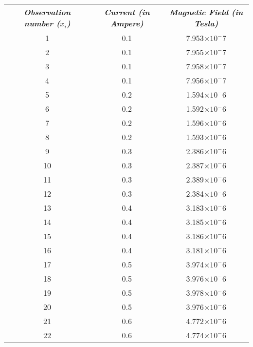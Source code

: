 \begin{table}[H]
        \centering
            \begin{tabular}{|c|c|c|}
            \hline\hline
            \textit{Observation number ($x_i$)} & \textit{Current (in Ampere)} & \textit{Magnetic Field (in Tesla)}\\
            \hline
            \hline
            1 & 0.1 & 7.953$\times10^-7$ \\
            \hline
            2 & 0.1 & 7.955$\times10^-7$ \\
            \hline
            3 & 0.1 & 7.958$\times10^-7$ \\
            \hline
            4 & 0.1 & 7.956$\times10^-7$ \\
            \hline
            5 & 0.2 & 1.594$\times10^-6$ \\
            \hline
            6 & 0.2 & 1.592$\times10^-6$ \\
            \hline
            7 & 0.2 & 1.596$\times10^-6$ \\
            \hline
            8 & 0.2 & 1.593$\times10^-6$ \\
            \hline
            9 & 0.3 & 2.386$\times10^-6$ \\
            \hline
            10 & 0.3 & 2.387$\times10^-6$ \\
            \hline
            11 & 0.3 & 2.389$\times10^-6$ \\
            \hline
            12 & 0.3 & 2.384$\times10^-6$ \\
            \hline
            13 & 0.4 & 3.183$\times10^-6$ \\
            \hline
            14 & 0.4 & 3.185$\times10^-6$ \\
            \hline
            15 & 0.4 & 3.186$\times10^-6$ \\
            \hline
            16 & 0.4 & 3.181$\times10^-6$ \\
            \hline
            17 & 0.5 & 3.974$\times10^-6$ \\
            \hline
            18 & 0.5 & 3.976$\times10^-6$ \\
            \hline
            19 & 0.5 & 3.978$\times10^-6$ \\
            \hline
            20 & 0.5 & 3.976$\times10^-6$ \\
            \hline
            21 & 0.6 & 4.772$\times10^-6$ \\
            \hline
            22 & 0.6 & 4.774$\times10^-6$ \\

\end{tabular}
\end{table}
